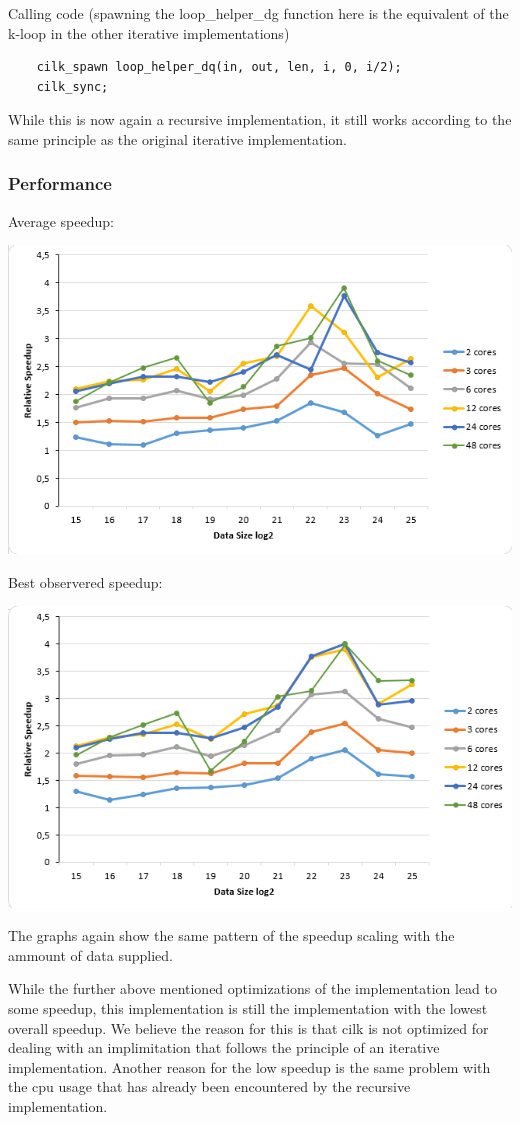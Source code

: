 Calling code (spawning the loop_helper_dg function here is the equivalent of the k-loop in the other iterative implementations)
\begin{lstlisting}
	cilk_spawn loop_helper_dq(in, out, len, i, 0, i/2);
    cilk_sync;
\end{lstlisting}

While this is now again a recursive implementation, it still works according to the same principle as the original iterative implementation. 

\subsubsection{Performance}

Average speedup:

\includegraphics[width=\textwidth]{cilk_it_avg.png}

Best observered speedup:

\includegraphics[width=\textwidth]{cilk_it_best.png}

The graphs again show the same pattern of the speedup scaling with the ammount of data supplied. 

While the further above mentioned optimizations of the implementation lead to some speedup, this implementation is still the implementation with the lowest overall speedup. We believe the reason for this is that cilk is not optimized for dealing with an implimitation that follows the principle of an iterative implementation. Another reason for the low speedup is the same problem with the cpu usage that has already been encountered by the recursive implementation.